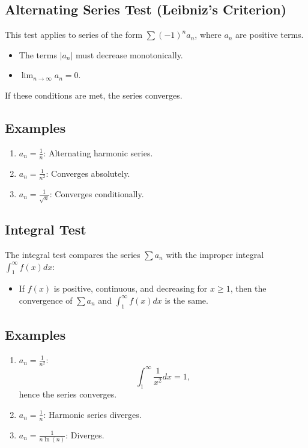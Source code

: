 \documentclass[a4paper, 12pt]{article}
\begin{document}
\pagebreak

\subsection{Alternating Series Test (Leibniz's Criterion)}
This test applies to series of the form \(\sum (-1)^n a_n\), where \(a_n\) are positive terms.
\begin{itemize}
    \item The terms \(|a_n|\) must decrease monotonically.
    \item \(\lim_{n \to \infty} a_n = 0\).
\end{itemize}
If these conditions are met, the series converges.

\subsection*{Examples}
\begin{enumerate}
    \item \(a_n = \frac{1}{n}\): Alternating harmonic series.
    \item \(a_n = \frac{1}{n^2}\): Converges absolutely.
    \item \(a_n = \frac{1}{\sqrt{n}}\): Converges conditionally.
\end{enumerate}

\subsection{Integral Test}
The integral test compares the series \(\sum a_n\) with the improper integral \(\int_1^\infty f(x) dx\):
\begin{itemize}
    \item If \(f(x)\) is positive, continuous, and decreasing for \(x \geq 1\), then the convergence of \(\sum a_n\) and \(\int_1^\infty f(x)dx\) is the same.
\end{itemize}

\subsection*{Examples}
\begin{enumerate}
    \item \(a_n = \frac{1}{n^2}\):
    \[\int_1^\infty \frac{1}{x^2} dx = 1,\]
    hence the series converges.

    \item \(a_n = \frac{1}{n}\): Harmonic series diverges.

    \item \(a_n = \frac{1}{n \ln(n)}\): Diverges.
\end{enumerate}
\end{document}
